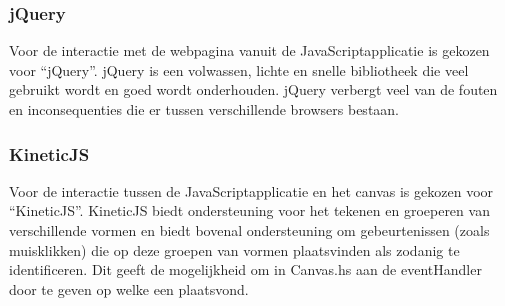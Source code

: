 \subsubsection{jQuery}
Voor de interactie met de webpagina vanuit de JavaScriptapplicatie is gekozen voor ``jQuery''. jQuery is een volwassen, lichte en snelle bibliotheek die veel gebruikt wordt en goed wordt onderhouden. jQuery verbergt veel van de fouten en inconsequenties die er tussen verschillende browsers bestaan. 

\subsubsection{KineticJS}
Voor de interactie tussen de JavaScriptapplicatie en het canvas is gekozen voor ``KineticJS''. KineticJS biedt ondersteuning voor het tekenen en groeperen van verschillende vormen en biedt bovenal ondersteuning om gebeurtenissen (zoals muisklikken) die op deze groepen van vormen plaatsvinden als zodanig te identificeren. Dit geeft de mogelijkheid om in Canvas.hs aan de eventHandler door te geven op welke  een  plaatsvond.
